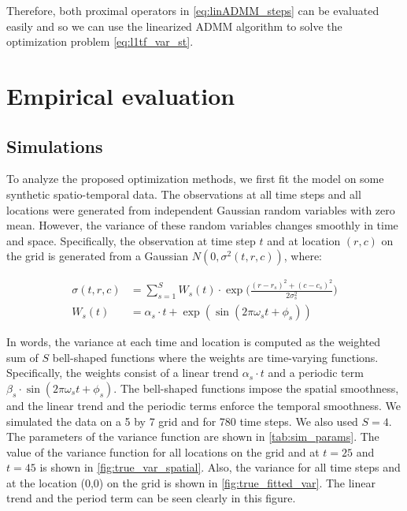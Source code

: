 \documentclass{article}
\begin{document}
Therefore, both proximal operators in \eqref{eq:linADMM_steps} can be evaluated easily and so we can use the linearized ADMM algorithm to solve the optimization problem \eqref{eq:l1tf_var_st}.


\section{Empirical evaluation}


\subsection{Simulations}
\label{sec:simulations}

To analyze the proposed optimization methods, we first fit the model on some synthetic spatio-temporal data. The observations at all time steps and all locations were generated from independent Gaussian random variables with zero mean. However, the variance of these random variables changes smoothly in time and space. Specifically, the observation at time step $t$ and at location $(r,c)$ on the grid is generated from a Gaussian $N(0,\sigma^2(t,r,c))$, where:

\begin{equation}
\begin{aligned}
\sigma(t,r,c) & =\sum_{s=1}^{S} W_s(t) \cdot \exp\bigg( \frac{(r-r_s)^2+(c-c_s)^2}{2\sigma_s^2} \bigg) \\
W_s(t) & =\alpha_s \cdot t + \exp(\sin(2\pi\omega_s t+\phi_s)) 
\label{eq:sourceVar}
\end{aligned}
\end{equation}

In words, the variance at each time and location is computed as the weighted sum of $S$ bell-shaped functions where the weights are time-varying functions. Specifically, the weights consist of a linear trend $\alpha_s \cdot t$ and a periodic term $\beta_s \cdot \sin(2\pi\omega_s t+\phi_s)$. The bell-shaped functions impose the spatial smoothness, and the linear trend and the periodic terms enforce the temporal smoothness. We simulated the data on a 5 by 7 grid and for 780 time steps. We also used $S=4$. The parameters of the variance function are shown in  \autoref{tab:sim_params}. The value of the variance function for all locations on the grid and at $t=25$ and $t=45$ is shown in \autoref{fig:true_var_spatial}. Also, the variance for all time steps and at the location (0,0) on the grid is shown in \autoref{fig:true_fitted_var}. The linear trend and the period term can be seen clearly in this figure.
\end{document}
